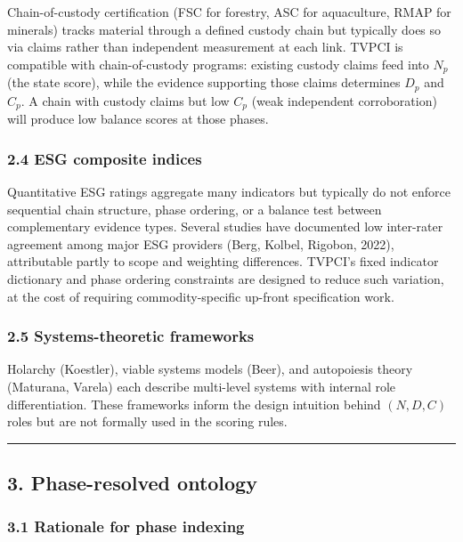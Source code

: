 \documentclass[
  11pt,
  letterpaper,
]{article}
\begin{document}
Chain-of-custody certification (FSC for forestry, ASC for aquaculture,
RMAP for minerals) tracks material through a defined custody chain but
typically does so via claims rather than independent measurement at each
link. TVPCI is compatible with chain-of-custody programs: existing
custody claims feed into \(N_p\) (the state score), while the evidence
supporting those claims determines \(D_p\) and \(C_p\). A chain with
custody claims but low \(C_p\) (weak independent corroboration) will
produce low balance scores at those phases.

\subsubsection{2.4 ESG composite indices}\label{esg-composite-indices}

Quantitative ESG ratings aggregate many indicators but typically do not
enforce sequential chain structure, phase ordering, or a balance test
between complementary evidence types. Several studies have documented
low inter-rater agreement among major ESG providers (Berg, Kolbel,
Rigobon, 2022), attributable partly to scope and weighting differences.
TVPCI's fixed indicator dictionary and phase ordering constraints are
designed to reduce such variation, at the cost of requiring
commodity-specific up-front specification work.

\subsubsection{2.5 Systems-theoretic
frameworks}\label{systems-theoretic-frameworks}

Holarchy (Koestler), viable systems models (Beer), and autopoiesis
theory (Maturana, Varela) each describe multi-level systems with
internal role differentiation. These frameworks inform the design
intuition behind \((N, D, C)\) roles but are not formally used in the
scoring rules.

\begin{center}\rule{0.5\linewidth}{0.5pt}\end{center}

\subsection{3. Phase-resolved ontology}\label{phase-resolved-ontology}

\subsubsection{3.1 Rationale for phase
indexing}\label{rationale-for-phase-indexing}
\end{document}
